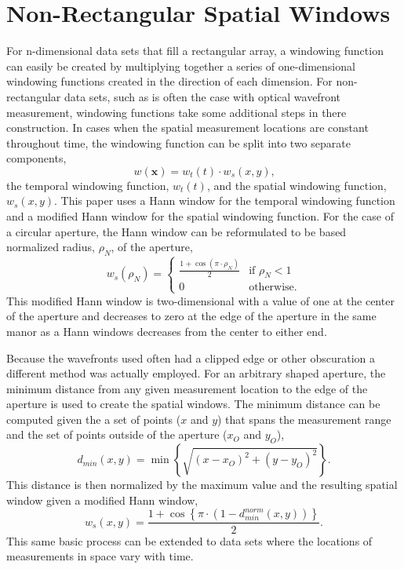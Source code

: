 \section{Non-Rectangular Spatial Windows}
For n-dimensional data sets that fill a rectangular array, a windowing function can easily be created by multiplying together a series of one-dimensional windowing functions created in the direction of each dimension.
For non-rectangular data sets, such as is often the case with optical wavefront measurement, windowing functions take some additional steps in there construction.
In cases when the spatial measurement locations are constant throughout time, the windowing function can be split into two separate components,
\begin{equation}
 w(\mathbf{x}) = w_t(t)\cdot w_s(x,y) \textrm{,}
 \label{eqn:04_window_sep}
\end{equation}
the temporal windowing function, $w_t(t)$, and the spatial windowing function, $w_s(x,y)$.
This paper uses a Hann window for the temporal windowing function and a modified Hann window for the spatial windowing function.
For the case of a circular aperture, the Hann window can be reformulated to be based normalized radius, $\rho_N$, of the aperture,
\begin{equation}
 w_s(\rho_N) =
 \begin{cases}
  \frac{1+\cos(\pi\cdot\rho_N)}{2} & \textrm{if } \rho_N < 1 \\
  0                                & \textrm{otherwise.}
 \end{cases}
 \label{eqn:04_window_space}
\end{equation}
This modified Hann window is two-dimensional with a value of one at the center of the aperture and decreases to zero at the edge of the aperture in the same manor as a Hann windows decreases from the center to either end.

Because the wavefronts used often had a clipped edge or other obscuration a different method was actually employed.
For an arbitrary shaped aperture, the minimum distance from any given measurement location to the edge of the aperture is used to create the spatial windows.
The minimum distance can be computed given the a set of points ($x$ and $y$) that spans the measurement range and the set of points outside of the aperture ($x_O$ and $y_O$),
\begin{equation}
 d_{min}(x,y) = \min\left\{\sqrt{(x-x_{O})^2+(y-y_{O})^2}\right\} \textrm{.}
 \label{eqn:04_window_space_arb_dist}
\end{equation}
This distance is then normalized by the maximum value and the resulting spatial window given a modified Hann window,
\begin{equation}
 w_s(x,y) = \frac{1+\cos\left\{\pi\cdot\left(1-d_{min}^{norm}(x,y)\right)\right\}}{2} \textrm{.}
 \label{eqn:04_window_space_arb}
\end{equation}
This same basic process can be extended to data sets where the locations of measurements in space vary with time.

